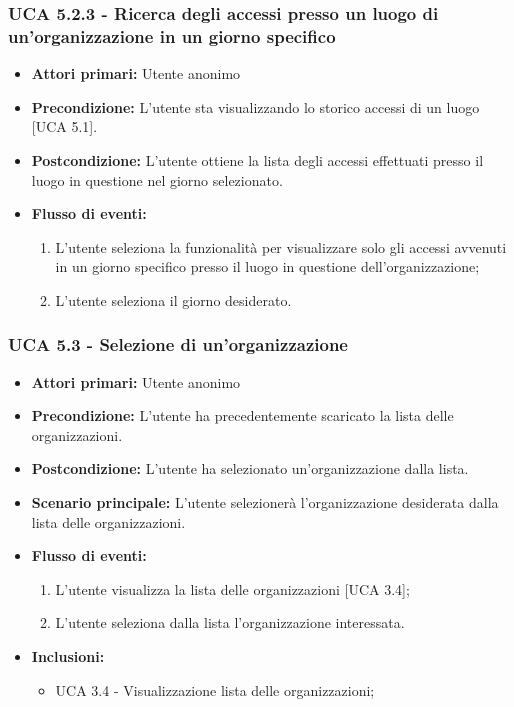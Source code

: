 \subsubsection{UCA 5.2.3 - Ricerca degli accessi presso un luogo di un'organizzazione in un giorno specifico}
\begin{itemize}
    \item \textbf{Attori primari:} Utente anonimo
    \item \textbf{Precondizione:} L'utente sta visualizzando lo storico accessi di un luogo [UCA 5.1].
    \item \textbf{Postcondizione:} L'utente ottiene la lista degli accessi effettuati presso il luogo in questione nel giorno selezionato.
    \item \textbf{Flusso di eventi:}
    \begin{enumerate}
        \item L'utente seleziona la funzionalità per visualizzare solo gli accessi avvenuti in un giorno specifico presso il luogo in questione dell'organizzazione;
        \item L'utente seleziona il giorno desiderato.
    \end{enumerate}
\end{itemize}

\subsubsection{UCA 5.3 - Selezione di un'organizzazione}
\begin{itemize}
    \item \textbf{Attori primari:} Utente anonimo
    \item \textbf{Precondizione:} L'utente ha precedentemente scaricato la lista delle organizzazioni.
    \item \textbf{Postcondizione:} L'utente ha selezionato un'organizzazione dalla lista.
    \item \textbf{Scenario principale:} L'utente selezionerà l'organizzazione desiderata dalla lista delle organizzazioni.
    \item \textbf{Flusso di eventi:}
    \begin{enumerate}
        \item L'utente visualizza la lista delle organizzazioni [UCA 3.4];
        \item L'utente seleziona dalla lista l'organizzazione interessata.
    \end{enumerate}
    \item \textbf{Inclusioni:}
    \begin{itemize}
        \item UCA 3.4 - Visualizzazione lista delle organizzazioni;
    \end{itemize}
\end{itemize}